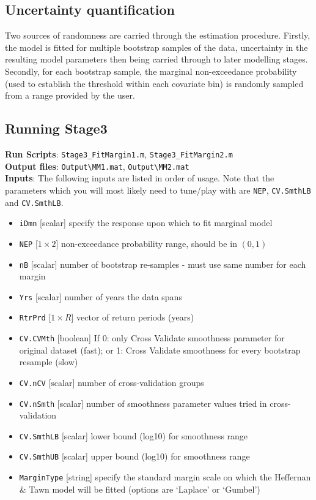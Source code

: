 \subsection{Uncertainty quantification}
Two sources of randomness are carried through the estimation procedure. Firstly, the model is fitted for multiple bootstrap samples of the data, uncertainty in the resulting model parameters then being carried through to later modelling stages. Secondly, for each bootstrap sample, the marginal non-exceedance probability (used to establish the threshold within each covariate bin) is randomly sampled from a range provided by the user. 

\subsection{Running Stage3}\label{Sct:RunStg3}

\textbf{Run Scripts}: \verb|Stage3_FitMargin1.m|, \verb|Stage3_FitMargin2.m|\\
\textbf{Output files}: \verb|Output\MM1.mat|, \verb|Output\MM2.mat|\\
\textbf{Inputs}: The following inputs are listed in order of usage. Note that the parameters which you will most likely need to tune/play with are \verb|NEP|, \verb|CV.SmthLB| and \verb|CV.SmthLB|.
\begin{itemize}
	\item \verb|iDmn| [scalar] specify the response upon which to fit marginal model
	\item \verb|NEP| [$1 \times 2$] non-exceedance probability range, should be in $(0,1)$
	\item \verb|nB| [scalar] number of bootstrap re-samples - must use same number for each margin
	\item \verb|Yrs| [scalar] number of years the data spans
	\item \verb|RtrPrd| [$1 \times R$] vector of return periods (years)
	\item \verb|CV.CVMth| [boolean] If 0: only Cross Validate smoothness parameter for original dataset (fast); or 1: Cross Validate smoothness for every bootstrap resample (slow)
	 \item \verb|CV.nCV| [scalar] number of cross-validation groups
 	\item \verb|CV.nSmth| [scalar] number of smoothness parameter values tried in cross-validation
 	\item \verb|CV.SmthLB| [scalar] lower bound (log10) for smoothness range
 	\item \verb|CV.SmthUB| [scalar] upper bound (log10) for smoothness range
	 \item \verb|MarginType| [string] specify the standard margin scale on which the Heffernan \& Tawn model will be fitted (options are `Laplace' or `Gumbel')
\end{itemize}


